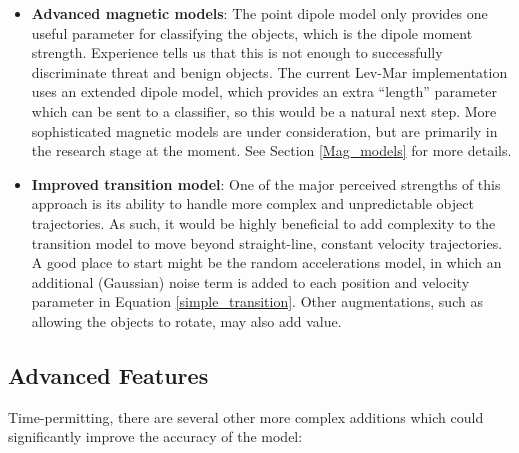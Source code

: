 \documentclass[10pt, a4paper, twocolumn]{article} %
\begin{document}
\begin{itemize}
	\item \textbf{Advanced magnetic models}: The point dipole model only provides one useful parameter for classifying the objects, which is the dipole moment strength. Experience tells us that this is not enough to successfully discriminate threat and benign objects. The current Lev-Mar implementation uses an extended dipole model, which provides an extra “length” parameter which can be sent to a classifier, so this would be a natural next step. More sophisticated magnetic models are under consideration, but are primarily in the research stage at the moment. See Section \ref{Mag_models} for more details.
	
	\item \textbf{Improved transition model}: One of the major perceived strengths of this approach is its ability to handle more complex and unpredictable object trajectories. As such, it would be highly beneficial to add complexity to the transition model to move beyond straight-line, constant velocity trajectories. A good place to start might be the random accelerations model, in which an additional (Gaussian) noise term is added to each position and velocity parameter in Equation \ref{simple_transition}. Other augmentations, such as allowing the objects to rotate, may also add value.
	
\end{itemize}

\subsection{Advanced Features}

Time-permitting, there are several other more complex additions which could significantly improve the accuracy of the model:
\end{document}
